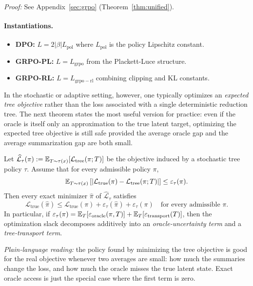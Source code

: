 \noindent\textit{Proof:} See Appendix~\ref{sec:grpo} (Theorem~\ref{thm:unified}).

\paragraph{Instantiations.}
\begin{itemize}[nosep]
    \item \textbf{DPO:} $L = 2|\beta| L_{\mathrm{pol}}$ where $L_{\mathrm{pol}}$ is the policy Lipschitz constant.
    \item \textbf{GRPO-PL:} $L = L_{\mathrm{grpo}}$ from the Plackett-Luce structure.
    \item \textbf{GRPO-RL:} $L = L_{\mathrm{grpo-rl}}$ combining clipping and KL constants.
\end{itemize}

In the stochastic or adaptive setting, however, one typically optimizes an
\emph{expected tree objective} rather than the loss associated with a single
deterministic reduction tree. The next theorem states the most useful version
for practice: even if the oracle is itself only an approximation to the true
latent target, optimizing the expected tree objective is still safe provided the
average oracle gap and the average summarization gap are both small.

\begin{theorem}
\label{thm:expected-tree-opt}
Let $\widehat{\mathcal{L}}_{\tau}(\pi)
  := \mathbb{E}_{T \sim \tau(x)}[\mathcal{L}_{\mathrm{tree}}(\pi; T)]$
be the objective induced by a stochastic tree policy $\tau$. Assume that for
every admissible policy $\pi$,
\[
\mathbb{E}_{T \sim \tau(x)}
  \left[
    \left|
      \mathcal{L}_{\mathrm{true}}(\pi) -
      \mathcal{L}_{\mathrm{tree}}(\pi; T)
    \right|
  \right]
  \le \varepsilon_{\tau}(\pi).
\]
Then every exact minimizer $\widehat{\pi}$ of
$\widehat{\mathcal{L}}_{\tau}$ satisfies
\[
\mathcal{L}_{\mathrm{true}}(\widehat{\pi})
\le
\mathcal{L}_{\mathrm{true}}(\pi)
  + \varepsilon_{\tau}(\widehat{\pi})
  + \varepsilon_{\tau}(\pi)
\quad
\text{for every admissible } \pi.
\]
In particular, if
$\varepsilon_{\tau}(\pi)=
\mathbb{E}_{T}[\varepsilon_{\mathrm{oracle}}(\pi,T)] +
\mathbb{E}_{T}[\varepsilon_{\mathrm{transport}}(T)]$,
then the optimization slack decomposes additively into an
\emph{oracle-uncertainty term} and a \emph{tree-transport term}.
\end{theorem}

\noindent\textit{Plain-language reading:} the policy found by minimizing the
tree objective is good for the real objective whenever two averages are small:
how much the summaries change the loss, and how much the oracle misses the true
latent state. Exact oracle access is just the special case where the first term
is zero.

